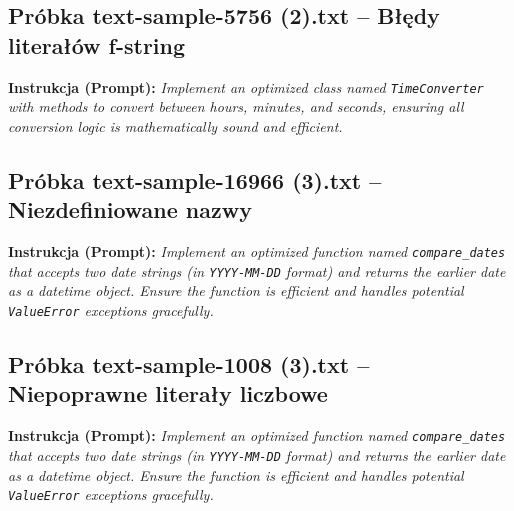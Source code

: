 \subsection{Próbka text-sample-5756 (2).txt -- Błędy literałów f-string}
\label{sec:lst:text-sample-5756-2}
\textbf{Instrukcja (Prompt):} \textit{Implement an optimized class named \texttt{TimeConverter} with methods to convert between hours, minutes, and seconds, ensuring all conversion logic is mathematically sound and efficient.}



\subsection{Próbka text-sample-16966 (3).txt -- Niezdefiniowane nazwy}
\label{sec:lst:text-sample-16966-3}
\textbf{Instrukcja (Prompt):} \textit{Implement an optimized function named \texttt{compare\_dates} that accepts two date strings (in \texttt{YYYY-MM-DD} format) and returns the earlier date as a datetime object. Ensure the function is efficient and handles potential \texttt{ValueError} exceptions gracefully.}



\subsection{Próbka text-sample-1008 (3).txt -- Niepoprawne literały liczbowe}
\label{sec:lst:text-sample-1008-3}
\textbf{Instrukcja (Prompt):} \textit{Implement an optimized function named \texttt{compare\_dates} that accepts two date strings (in \texttt{YYYY-MM-DD} format) and returns the earlier date as a datetime object. Ensure the function is efficient and handles potential \texttt{ValueError} exceptions gracefully.}



